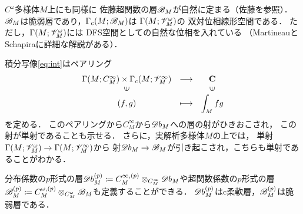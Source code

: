 \(C^\omega\)多様体\(M\)上にも同様に
佐藤超関数の層\(\mathscr{B}_M\)が自然に定まる（佐藤\cite{Sa59}を参照）．
\(\mathscr{B}_M\)は脆弱層であり，\(\Gamma_c(M;\mathscr{B}_M)\)は
\(\Gamma(M;\mathscr{V}_M^\omega)\)の
双対位相線形空間である．
ただし，\(\Gamma(M;\mathscr{V}_M^\omega)\)には
DFS空間としての自然な位相を入れている
（MartineauとSchapiraに詳細な解説がある）．

積分写像\eqref{eq:int}はペアリング
\begin{equation}
    \begin{array}{ccc}
        {\Gamma(M;C_M^\infty)\times\Gamma_c(M;\scV_M^\infty)}&\longrightarrow&\cc\\
        \rotatebox{90}{$\in$}&&\rotatebox{90}{$\in$}\\
        (f,g)&\longmapsto&\dip\int_Mfg
    \end{array}
\end{equation}
を定める．
このペアリングから\(C^\infty_M\)から\(\mathord{\mathscr{D}b}_M\)への層の射がひきおこされ，
この射が単射であることも示せる．
さらに，実解析多様体\(M\)の上では，
単射\(\Gamma(M;\mathscr{V}_M^\omega)\to\Gamma(M;\mathscr{V}_M^\infty)\)から
射\(\mathord{\mathscr{D}b}_M\to\mathscr{B}_M\)が引き起こされ，こちらも単射であることがわかる．

分布係数の\(p\)形式の層\(
    \mathord{\mathscr{D}b}_M^{(p)}
    \coloneqq 
    C^{\infty,(p)}_M\otimes_{C^\infty_M}\mathord{\mathscr{D}b}_M
\)や超関数係数の\(p\)形式の層\(
    \mathscr{B}_M^{(p)}
    \coloneqq 
    C^{\omega,(p)}_M\otimes_{C^\omega_M}\mathscr{B}_M
\)も定義することができる．
\(\mathord{\mathscr{D}b}_M^{(p)}\)はc柔軟層，\(\mathscr{B}_M^{(p)}\)は脆弱層である．




